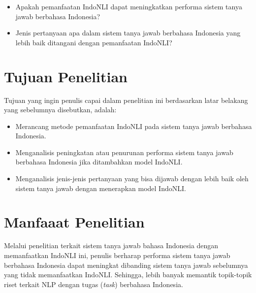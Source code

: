 \begin{itemize}

    \item Apakah pemanfaatan IndoNLI dapat meningkatkan performa sistem tanya jawab berbahasa Indonesia?

    \item Jenis pertanyaan apa dalam sistem tanya jawab berbahasa Indonesia yang lebih baik ditangani dengan pemanfaatan IndoNLI?
    
\end{itemize}

\section{Tujuan Penelitian}
\label{sec:tujuanPenelitian}
Tujuan yang ingin penulis capai dalam penelitian ini berdasarkan latar belakang yang sebelumnya disebutkan, adalah:

\begin{itemize}

    \item Merancang metode pemanfaatan IndoNLI pada sistem tanya jawab berbahasa Indonesia.

    \item Menganalisis peningkatan atau penurunan performa sistem tanya jawab berbahasa Indonesia jika ditambahkan model IndoNLI.

    \item Menganalisis jenis-jenis pertanyaan yang bisa dijawab dengan lebih baik oleh sistem tanya jawab dengan menerapkan model IndoNLI.
    
\end{itemize}

\section{Manfaaat Penelitian}
Melalui penelitian terkait sistem tanya jawab bahasa Indonesia dengan memanfaatkan IndoNLI ini, penulis berharap performa sistem tanya jawab berbahasa Indonesia dapat meningkat dibanding sistem tanya jawab sebelumnya yang tidak memanfaatkan IndoNLI. Sehingga, lebih banyak memantik topik-topik riset terkait NLP dengan tugas (\emph{task}) berbahasa Indonesia.

